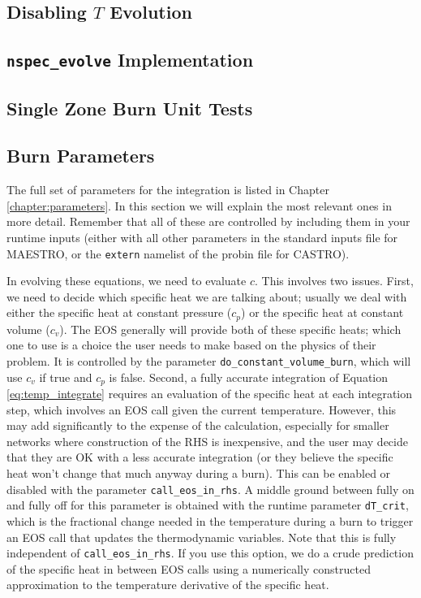 \subsection{Disabling $T$ Evolution}


\subsection{{\tt nspec\_evolve} Implementation}


\subsection{Single Zone Burn Unit Tests}


\subsection{Burn Parameters}

The full set of parameters for the integration is listed in Chapter \ref{chapter:parameters}.
In this section we will explain the most relevant ones in more detail.
Remember that all of these are controlled by including them in your runtime
inputs (either with all other parameters in the standard inputs file for
MAESTRO, or the \texttt{extern} namelist of the probin file for CASTRO).

In evolving these equations, we need to evaluate $c$. This involves two
issues. First, we need to decide which specific heat we are talking about;
usually we deal with either the specific heat at constant pressure ($c_p$)
or the specific heat at constant volume ($c_v$). The EOS generally will
provide both of these specific heats; which one to use is a choice the user
needs to make based on the physics of their problem. It is controlled by the
parameter \texttt{do\_constant\_volume\_burn}, which will use $c_v$ if true
and $c_p$ is false. Second, a fully accurate integration of Equation
\ref{eq:temp_integrate} requires an evaluation of the specific heat at
each integration step, which involves an EOS call given the current temperature.
However, this may add significantly to the expense of the calculation,
especially for smaller networks where construction of the RHS is inexpensive,
and the user may decide that they are OK with a less accurate integration
(or they believe the specific heat won't change that much anyway during a burn).
This can be enabled or disabled with the parameter \texttt{call\_eos\_in\_rhs}.
A middle ground between fully on and fully off for this parameter is obtained
with the runtime parameter \texttt{dT\_crit}, which is the fractional change
needed in the temperature during a burn to trigger an EOS call that updates
the thermodynamic variables. Note that this is fully independent of
\texttt{call\_eos\_in\_rhs}. If you use this option, we do a crude prediction
of the specific heat in between EOS calls using a numerically constructed
approximation to the temperature derivative of the specific heat.


